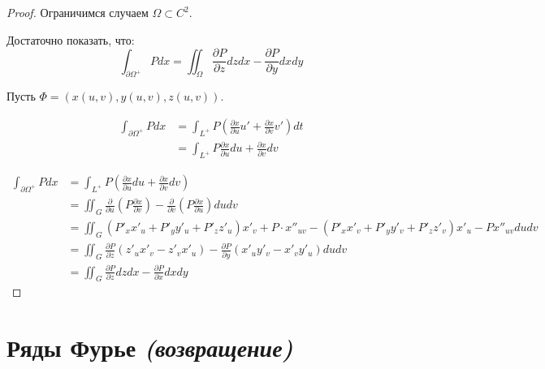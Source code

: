 \begin{proof}
    Ограничимся случаем \(\Omega \subset C^2\).

    Достаточно показать, что:
    \[\int_{\partial \Omega^{ +}} P dx = \iint_\Omega \frac{\partial P}{\partial z} dz dx - \frac{\partial P}{\partial y} dx dy\]

    Пусть \(\Phi = (x(u, v), y(u, v), z(u, v))\).

    \begin{align*}
        \int_{\partial \Omega^{ +}} P dx & =\int_{L^+} P \left( \frac{\partial x}{\partial u} u' + \frac{\partial x}{\partial v} v' \right) dt \\
                                         & =\int_{L^+} P \frac{\partial x}{\partial u} du + \frac{\partial x}{\partial v} dv
    \end{align*}

    \begin{align*}
        \int_{\partial \Omega^{ +}} P dx & = \int_{L^{ +}} P \left( \frac{\partial x}{\partial u} du + \frac{\partial x}{\partial v} dv \right)                                                                    \\
                                         & = \iint_G \frac{\partial}{\partial u} \left( P \frac{\partial x}{\partial v} \right) - \frac{\partial}{\partial v} \left( P \frac{\partial x}{\partial u} \right) du dv \\
                                         & = \iint_G (P'_x x'_u + P'_y y'_u + P'_z z'_u)x'_v + P \cdot x''_{uv} - (P'_x x'_v + P'_y y'_v + P'_z z'_v) x'_u - P x''_{uv} du dv                                      \\
                                         & = \iint_G \frac{\partial P}{\partial z} (z'_u x'_v - z'_v x'_u) - \frac{\partial P}{\partial y} (x'_u y'_v - x'_v y'_u) du dv                                           \\
                                         & = \iint_G \frac{\partial P}{\partial z} dz dx - \frac{\partial P}{\partial x} dx dy
    \end{align*}
\end{proof}

\section{Ряды Фурье \textit{(возвращение)}}

